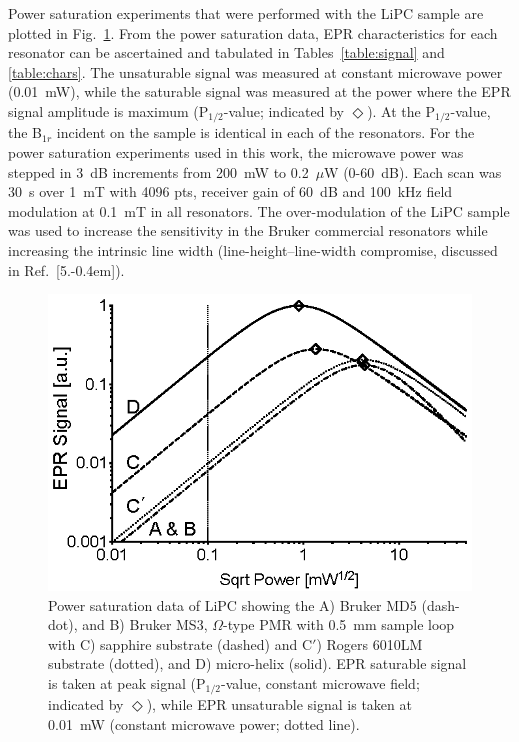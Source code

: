 Power saturation experiments that were performed with the LiPC sample are plotted in Fig.~\ref{fig:lipcpwrsat}. From the power saturation data, EPR characteristics for each resonator can be ascertained and tabulated in Tables~\ref{table:signal} and \ref{table:chars}. The unsaturable signal was measured at constant microwave power (0.01~mW), while the saturable signal was measured at the power where the EPR signal amplitude is maximum (P$_{1/2}$-value; indicated by $\Diamond$). At the P$_{1/2}$-value, the B$_{1r}$ incident on the sample is identical in each of the resonators. For the power saturation experiments used in this work, the microwave power was stepped in 3~dB increments from 200~mW to 0.2~$\mu$W (0-60~dB). Each scan was 30~s over 1~mT with 4096 pts, receiver gain of 60~dB and 100~kHz field modulation at 0.1~mT in all resonators. The over-modulation of the LiPC sample was used to increase the sensitivity in the Bruker commercial resonators while increasing the intrinsic line width (line-height--line-width compromise, discussed in Ref.~[5.\kern-0.4em]). 

\begin{figure}[htb]
\centering
\includegraphics{Kapitel/Appendix/Images/S4-LiPCPowerSat.eps}
\caption[Power saturation data of LiPC comparing resonators.]{Power saturation data of LiPC showing the A) Bruker MD5 (dash-dot), and B) Bruker MS3, $\Omega$-type PMR with 0.5~mm sample loop with C) sapphire substrate (dashed) and C$'$) Rogers 6010LM substrate (dotted), and D) micro-helix (solid). EPR saturable signal is taken at peak signal (P$_{1/2}$-value, constant microwave field; indicated by $\Diamond$), while EPR unsaturable signal is taken at 0.01~mW (constant microwave power; dotted line).}
\label{fig:lipcpwrsat}
\end{figure}

